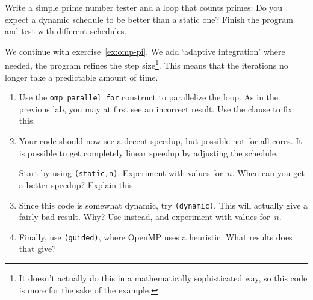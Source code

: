 \begin{exercise}
  Write a simple prime number tester and a loop that counts primes:
  Do you expect a dynamic schedule to be better than a static one?
  Finish the program and test with different schedules.
\end{exercise}

\begin{exercise}
  \label{ex:omp-pi-adapt}
  We continue with exercise~\ref{ex:omp-pi}.
  We add `adaptive integration'%
  where needed, the program refines the step
  size\footnote{It doesn't actually do this in a mathematically
    sophisticated way, so this code is more for the sake of the
    example.}.  This means that the iterations no longer take a
  predictable amount of time.

\begin{enumerate}
\item Use the \lstinline[language=omp]{omp parallel for} construct to parallelize the loop.
  As in the previous lab, you may at first see an incorrect result.
  Use the  clause to fix this.
\item Your code should now see a decent speedup, but possible not for all cores.
  It is possible to get completely linear speedup by adjusting the schedule.

  Start by using \lstinline[language=omp]{(static,n)}.
  Experiment with values for~$n$.
  When can you get a better speedup? Explain this.
\item Since this code is somewhat dynamic, try \lstinline[language=omp]{(dynamic)}.
  This will actually give a fairly bad result. Why?  Use
   instead, and experiment with values
  for~$n$.
\item Finally, use \lstinline[language=omp]{(guided)}, where OpenMP uses a
  heuristic.  What results does that give?
\end{enumerate}
\end{exercise}

